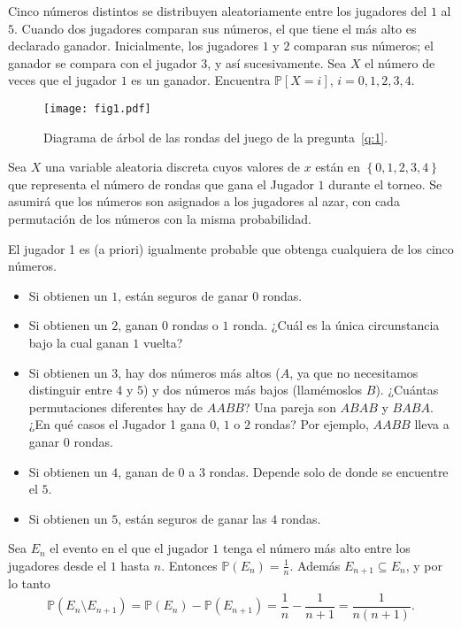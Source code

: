 \question\label{q:1}%
	Cinco números distintos se distribuyen aleatoriamente entre los jugadores del $1$ al $5$. Cuando dos jugadores comparan sus números, el que tiene el más alto es declarado ganador. Inicialmente, los jugadores $1$ y $2$ comparan sus números; el ganador se compara con el jugador $3$, y así sucesivamente. Sea $X$ el número de veces que el jugador $1$ es un ganador. Encuentra $\mathds{P}[X = i]$, $i = 0, 1, 2, 3, 4$.

	\ifprintanswers
	\begin{figure}[!ht]
		\centering
		\texttt{[image: fig1.pdf]}
		\caption{Diagrama de árbol de las rondas del juego de la pregunta~\ref{q:1}.}
		\label{fig:1}
	\end{figure}
	\fi
	
	\begin{solutionorbox}
		Sea $X$ una variable aleatoria discreta cuyos valores de $x$ están en $\left\{0,1,2,3,4\right\}$ que representa el número de rondas que gana el Jugador $1$ durante el torneo. Se asumirá que los números son asignados a los jugadores al azar, con cada permutación de los números con la misma probabilidad.

		El jugador 1 es (a priori) igualmente probable que obtenga cualquiera de los cinco números.
		\begin{itemize}
			\item Si obtienen un $1$, están seguros de ganar $0$ rondas.
			\item Si obtienen un $2$, ganan $0$ rondas o $1$ ronda. ¿Cuál es la única circunstancia bajo la cual ganan $1$ vuelta?
			\item Si obtienen un $3$, hay dos números más altos ($A$, ya que no necesitamos distinguir entre $4$ y $5$) y dos números más bajos (llamémoslos $B$). ¿Cuántas permutaciones diferentes hay de $AABB$? Una pareja son $ABAB$ y $BABA$. ¿En qué casos el Jugador 1 gana $0$, $1$ o $2$ rondas? Por ejemplo, $AABB$ lleva a ganar $0$ rondas.
			\item Si obtienen un $4$, ganan de $0$ a $3$ rondas. Depende solo de donde se encuentre el $5$.
			\item Si obtienen un $5$, están seguros de ganar las $4$ rondas.
		\end{itemize}

		Sea $E_n$ el evento en el que el jugador $1$ tenga el número más alto entre los jugadores desde el $1$ hasta $n$. Entonces $\mathds{P}\left(E_{n}\right)=\tfrac{1}{n}$. Además $E_{n+1}\subseteq E_{n}$, y por lo tanto
		\begin{equation*}
			\mathds{P}\left(E_{n}\setminus E_{n+1}\right)=\mathds{P}\left(E_{n}\right)-\mathds{P}\left(E_{n+1}\right)=\frac{1}{n}-\frac{1}{n+1}=\frac{1}{n\left(n+1\right)}.
		\end{equation*}
		

\end{solutionorbox}
